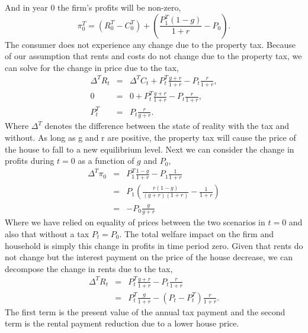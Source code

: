 \documentclass[ecta,nameyear,draft]{econsocart}
\theoremstyle{plain}
\theoremstyle{remark}
\begin{document}
And in year 0 the firm's profits will be non-zero,
\begin{equation}
	\pi^T_0 = (R^T_0-C^T_0)+\left(\frac{P^T_{1}(1-g)}{1+r}-P_0\right).\label{piT0}
\end{equation}
The consumer does not experience any change due to the property tax. Because of our assumption that rents and costs do not change due to the property tax, we can solve for the change in price due to the tax,
\begin{eqnarray}
	\Delta^T R_t&=&\Delta^T C_t+P^T_{t}\frac{g+r}{1+r}-P_{t} \frac{r}{1+r},\\
	0&=&0+P^T_{t}\frac{g+r}{1+r}-P_{t} \frac{r}{1+r},\\
	P^T_t&=& P_t\frac{r}{g+r}.
\end{eqnarray}
Where $\Delta^T$ denotes the difference between the state of reality with the tax and without. As long as g and r are positive, the property tax will cause the price of the house to fall to a new equilibrium level.
Next we can consider the change in profits during $t=0$ as a function of $g$ and $P_0$,
\begin{eqnarray}
	\Delta^T \pi_0 &=& P_1^T\frac{1-g}{1+r}-P_1\frac{1}{1+r}\\
	&=& P_1\left(\frac{r(1-g)}{(g+r)(1+r)}-\frac{1}{1+r}\right)\\
	&=&-P_0\frac{g}{g+r}
\end{eqnarray}
Where we have relied on equality of prices between the two scenarios in $t=0$ and also that without a tax $P_t=P_0$. The total welfare impact on the firm and household is simply this change in profits in time period zero.
Given that rents do not change but the interest payment on the price of the house decrease, we can decompose the change in rents due to the tax,
\begin{eqnarray}
	\Delta^T R_t&=&P^T_t\frac{g+r}{1+r}-P_t\frac{r}{1+r}\\
	&=&P^T_t\frac{g}{1+r}-(P_t-P_t^T)\frac{r}{1+r}.
\end{eqnarray}
The first term is the present value of the annual tax payment and the second term is the rental payment reduction due to a lower house price. 
\end{document}
